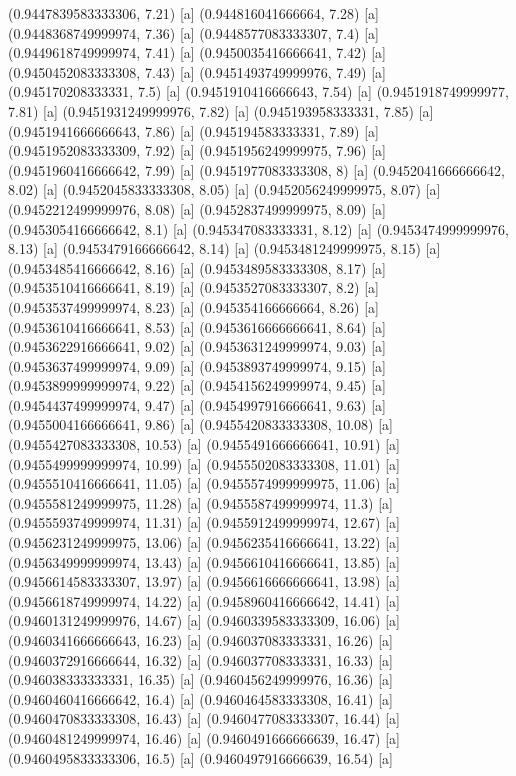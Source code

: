 {{{(0.9447839583333306, 7.21) [a] 
(0.944816041666664, 7.28) [a] 
(0.9448368749999974, 7.36) [a] 
(0.9448577083333307, 7.4) [a] 
(0.9449618749999974, 7.41) [a] 
(0.9450035416666641, 7.42) [a] 
(0.9450452083333308, 7.43) [a] 
(0.9451493749999976, 7.49) [a] 
(0.945170208333331, 7.5) [a] 
(0.9451910416666643, 7.54) [a] 
(0.9451918749999977, 7.81) [a] 
(0.9451931249999976, 7.82) [a] 
(0.945193958333331, 7.85) [a] 
(0.9451941666666643, 7.86) [a] 
(0.945194583333331, 7.89) [a] 
(0.9451952083333309, 7.92) [a] 
(0.9451956249999975, 7.96) [a] 
(0.9451960416666642, 7.99) [a] 
(0.9451977083333308, 8) [a] 
(0.9452041666666642, 8.02) [a] 
(0.9452045833333308, 8.05) [a] 
(0.9452056249999975, 8.07) [a] 
(0.9452212499999976, 8.08) [a] 
(0.9452837499999975, 8.09) [a] 
(0.9453054166666642, 8.1) [a] 
(0.945347083333331, 8.12) [a] 
(0.9453474999999976, 8.13) [a] 
(0.9453479166666642, 8.14) [a] 
(0.9453481249999975, 8.15) [a] 
(0.9453485416666642, 8.16) [a] 
(0.9453489583333308, 8.17) [a] 
(0.9453510416666641, 8.19) [a] 
(0.9453527083333307, 8.2) [a] 
(0.9453537499999974, 8.23) [a] 
(0.945354166666664, 8.26) [a] 
(0.9453610416666641, 8.53) [a] 
(0.9453616666666641, 8.64) [a] 
(0.9453622916666641, 9.02) [a] 
(0.9453631249999974, 9.03) [a] 
(0.9453637499999974, 9.09) [a] 
(0.9453893749999974, 9.15) [a] 
(0.9453899999999974, 9.22) [a] 
(0.9454156249999974, 9.45) [a] 
(0.9454437499999974, 9.47) [a] 
(0.9454997916666641, 9.63) [a] 
(0.9455004166666641, 9.86) [a] 
(0.9455420833333308, 10.08) [a] 
(0.9455427083333308, 10.53) [a] 
(0.9455491666666641, 10.91) [a] 
(0.9455499999999974, 10.99) [a] 
(0.9455502083333308, 11.01) [a] 
(0.9455510416666641, 11.05) [a] 
(0.9455574999999975, 11.06) [a] 
(0.9455581249999975, 11.28) [a] 
(0.9455587499999974, 11.3) [a] 
(0.9455593749999974, 11.31) [a] 
(0.9455912499999974, 12.67) [a] 
(0.9456231249999975, 13.06) [a] 
(0.9456235416666641, 13.22) [a] 
(0.9456349999999974, 13.43) [a] 
(0.9456610416666641, 13.85) [a] 
(0.9456614583333307, 13.97) [a] 
(0.9456616666666641, 13.98) [a] 
(0.9456618749999974, 14.22) [a] 
(0.9458960416666642, 14.41) [a] 
(0.9460131249999976, 14.67) [a] 
(0.9460339583333309, 16.06) [a] 
(0.9460341666666643, 16.23) [a] 
(0.946037083333331, 16.26) [a] 
(0.9460372916666644, 16.32) [a] 
(0.946037708333331, 16.33) [a] 
(0.946038333333331, 16.35) [a] 
(0.9460456249999976, 16.36) [a] 
(0.9460460416666642, 16.4) [a] 
(0.9460464583333308, 16.41) [a] 
(0.9460470833333308, 16.43) [a] 
(0.9460477083333307, 16.44) [a] 
(0.9460481249999974, 16.46) [a] 
(0.9460491666666639, 16.47) [a] 
(0.9460495833333306, 16.5) [a] 
(0.9460497916666639, 16.54) [a] 
}}}
